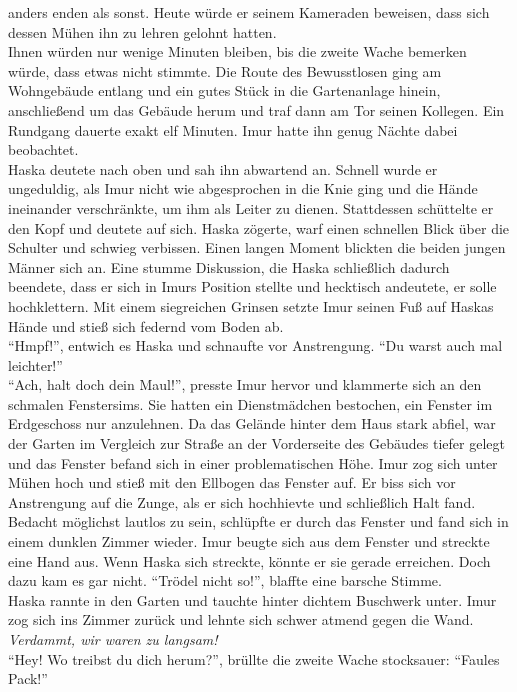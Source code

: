 anders enden als sonst. Heute würde er seinem Kameraden beweisen, dass sich dessen Mühen ihn zu 
lehren gelohnt hatten. \\ 
Ihnen würden nur wenige Minuten bleiben, bis die zweite Wache bemerken würde, dass etwas nicht 
stimmte. Die Route des Bewusstlosen ging am Wohngebäude entlang und ein gutes Stück in die 
Gartenanlage hinein, anschließend um das Gebäude herum und traf dann am Tor seinen Kollegen. Ein 
Rundgang dauerte exakt elf Minuten. Imur hatte ihn genug Nächte dabei beobachtet. \\
Haska deutete nach oben und sah ihn abwartend an. Schnell wurde er ungeduldig, als Imur nicht 
wie abgesprochen in die Knie ging und die Hände ineinander verschränkte, um ihm als Leiter zu 
dienen. Stattdessen schüttelte er den Kopf und deutete auf sich. Haska zögerte, warf einen 
schnellen Blick über die Schulter und schwieg verbissen. Einen langen Moment blickten die 
beiden jungen Männer sich an. Eine stumme Diskussion, die Haska schließlich dadurch beendete, 
dass er sich in Imurs Position stellte und hecktisch andeutete, er solle hochklettern. Mit 
einem siegreichen Grinsen setzte Imur seinen Fuß auf Haskas Hände und stieß sich federnd vom 
Boden ab. \\
``Hmpf!'', entwich es Haska und schnaufte vor Anstrengung. ``Du warst auch mal leichter!''\\
``Ach, halt doch dein Maul!'', presste Imur hervor und klammerte sich an den schmalen Fenstersims. 
Sie hatten ein Dienstmädchen bestochen, ein Fenster im Erdgeschoss nur anzulehnen. Da das Gelände 
hinter dem Haus stark abfiel, war der Garten im Vergleich zur Straße an der Vorderseite des 
Gebäudes tiefer gelegt und das Fenster befand sich in einer problematischen Höhe. Imur zog sich 
unter Mühen hoch und stieß mit den Ellbogen das Fenster auf. Er biss sich vor Anstrengung auf die 
Zunge, als er sich hochhievte und schließlich Halt fand. Bedacht möglichst lautlos zu sein, 
schlüpfte er durch das Fenster und fand sich in einem dunklen Zimmer wieder. Imur beugte sich aus 
dem Fenster und streckte eine Hand aus. Wenn Haska sich streckte, könnte er sie gerade erreichen. 
Doch dazu kam es gar nicht.
``Trödel nicht so!'', blaffte eine barsche Stimme.\\
Haska rannte in den Garten und tauchte hinter dichtem Buschwerk unter. Imur zog sich ins Zimmer 
zurück und lehnte sich schwer atmend gegen die Wand. \textit{Verdammt, wir waren zu langsam!}\\
``Hey! Wo treibst du dich herum?'', brüllte die zweite Wache stocksauer: ``Faules Pack!''\\
